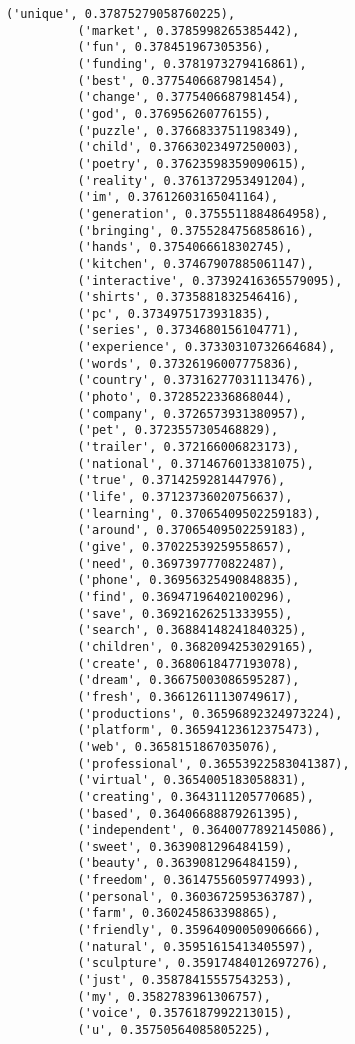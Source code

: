 \documentclass[11pt]{article}
\begin{document}
\begin{Verbatim}[commandchars=\\\{\}]
          ('unique', 0.37875279058760225),
          ('market', 0.3785998265385442),
          ('fun', 0.378451967305356),
          ('funding', 0.3781973279416861),
          ('best', 0.3775406687981454),
          ('change', 0.3775406687981454),
          ('god', 0.376956260776155),
          ('puzzle', 0.3766833751198349),
          ('child', 0.37663023497250003),
          ('poetry', 0.37623598359090615),
          ('reality', 0.3761372953491204),
          ('im', 0.37612603165041164),
          ('generation', 0.3755511884864958),
          ('bringing', 0.3755284756858616),
          ('hands', 0.3754066618302745),
          ('kitchen', 0.37467907885061147),
          ('interactive', 0.37392416365579095),
          ('shirts', 0.3735881832546416),
          ('pc', 0.3734975173931835),
          ('series', 0.3734680156104771),
          ('experience', 0.37330310732664684),
          ('words', 0.37326196007775836),
          ('country', 0.37316277031113476),
          ('photo', 0.3728522336868044),
          ('company', 0.3726573931380957),
          ('pet', 0.3723557305468829),
          ('trailer', 0.372166006823173),
          ('national', 0.3714676013381075),
          ('true', 0.3714259281447976),
          ('life', 0.37123736020756637),
          ('learning', 0.37065409502259183),
          ('around', 0.37065409502259183),
          ('give', 0.37022539259558657),
          ('need', 0.3697397770822487),
          ('phone', 0.36956325490848835),
          ('find', 0.36947196402100296),
          ('save', 0.36921626251333955),
          ('search', 0.36884148241840325),
          ('children', 0.3682094253029165),
          ('create', 0.3680618477193078),
          ('dream', 0.36675003086595287),
          ('fresh', 0.36612611130749617),
          ('productions', 0.36596892324973224),
          ('platform', 0.36594123612375473),
          ('web', 0.3658151867035076),
          ('professional', 0.36553922583041387),
          ('virtual', 0.3654005183058831),
          ('creating', 0.3643111205770685),
          ('based', 0.36406688879261395),
          ('independent', 0.3640077892145086),
          ('sweet', 0.3639081296484159),
          ('beauty', 0.3639081296484159),
          ('freedom', 0.36147556059774993),
          ('personal', 0.3603672595363787),
          ('farm', 0.360245863398865),
          ('friendly', 0.35964090050906666),
          ('natural', 0.35951615413405597),
          ('sculpture', 0.35917484012697276),
          ('just', 0.35878415557543253),
          ('my', 0.3582783961306757),
          ('voice', 0.3576187992213015),
          ('u', 0.35750564085805225),

\end{Verbatim}
\end{document}
